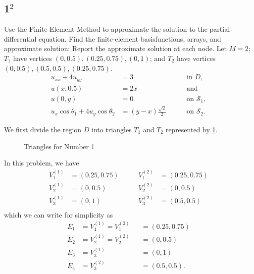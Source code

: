 \documentclass[12pt]{article}
\begin{document}
\subsection{1$^2$}
Use the Finite Element Method to approximate the solution to the partial
differential equation. Find the finite-element basisfunctions, arrays,
and approximate solution; Report the approximate solution at each
node. Let $M=2$; $T_1$ have vertices $(0,0.5), (0.25,0.75), (0,1)$; and
$T_2$ have vertices $(0,0.5), (0.5,0.5), (0.25,0.75)$.
\begin{equation}
  \label{eq:1_q}
  \begin{aligned}
    u_{xx}+4u_{yy} &= 3 &&\quad\text{ in } D, \\
    u(x,0.5) &= 2x
    &&\quad\text{ and } \\
    u(0,y) &= 0
    &&\quad\text{ on } \mathcal{S}_1, \\
    u_{x}\cos\theta_1 + 4u_{y}\cos\theta_2 &= (y-x)\frac{\sqrt{2}}{2}
    &&\quad\text{ on } \mathcal{S}_2.
  \end{aligned}
\end{equation}

%
%

We first divide the region $D$ into triangles $T_1$ and $T_2$
represented by \cref{fig:tri}.

\begin{figure}[H]
  \centering
  \caption{Triangles for Number 1}
  \label{fig:tri}
\end{figure}
In this problem, we have 
\begin{equation}
  \label{eq:1_v}
  \begin{aligned}
    V_1^{(1)} &= (0.25,0.75) &\qquad V_1^{(2)} &= (0.25,0.75) \\
    V_2^{(1)} &= (0,0.5)     &\qquad V_2^{(2)} &= (0,0.5) \\
    V_3^{(1)} &= (0,1)       &\qquad V_3^{(2)} &= (0.5,0.5) \\
  \end{aligned}
\end{equation}
which we can write for simplicity as
\begin{equation}
  \label{eq:1_e}
  \begin{aligned}
    E_1 &= V_1^{(1)} = V_1^{(2)} &&= (0.25,0.75) \\
    E_2 &= V_2^{(1)} = V_2^{(2)} &&= (0,0.5) \\
    E_3 &= V_3^{(1)} &&= (0,1) \\
    E_4 &= V_3^{(2)} &&= (0.5,0.5). \\
  \end{aligned}
\end{equation}
\end{document}
